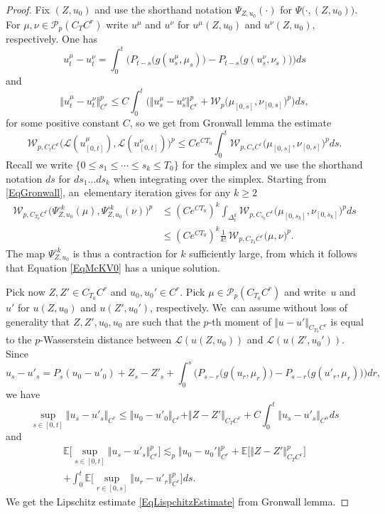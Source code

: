 \documentclass[10pt]{amsart}
\theoremstyle{definition}
\newcommand\bbE{\mathbb{E}}
\newcommand{\mcL}{\mathcal{L}}
\newcommand{\norme}[1]{\Vert #1 \Vert}
\begin{document}
\begin{proof}
Fix $(Z,u_0)$ and use the shorthand notation $\Psi_{Z,u_0}(\cdot)$ for $\Psi\bigl(\cdot,(Z,u_0)\bigr)$. For $\mu,\nu\in \mathcal{P}_p(C_TC^r)$ write $u^\mu$ and $u^{\nu}$ for $u^\mu(Z, u_0)$ and $u^{\nu}(Z, u_0)$, respectively. One has
\[
u^\mu_t - u_t^{\nu} = \int_0^t \bigl(P_{t-s}\bigl(g(u^\mu_s,\mu_s)\bigr) - P_{t-s}\bigl(g(u^{\nu}_s,\nu_s)\bigr)\bigr)ds
\]
and
\[
\big\Vert u^\mu_t-u^{\nu}_t \big\Vert_{C^r}^p \leq C\int_0^t \bigl(\big\Vert u^\mu_s - u^{\nu}_s\big\Vert_{C^r}^p + \mathcal{W}_p\bigl(\mu_{[0,s]},\nu_{[0,s]}\bigr)^p\bigr) ds,
\]
for some positive constant $C$, so we get from Gronwall lemma the estimate
\begin{equation} \label{EqGronwall}
\mathcal{W}_{p,C_tC^r}\bigl(\mcL(u^\mu_{[0,t]}),\mcL(u^{\nu}_{[0,t]})\bigr)^p \leq Ce^{CT_0}\int_0^t \mathcal{W}_{p,C_sC^r}\bigl(\mu_{[0,s]},\nu_{[0,s]}\bigr)^pds.
\end{equation}
Recall we write $\{0\leq s_1\leq \cdots\leq s_k\leq T_0\}$ for the simplex and we use the shorthand notation $ds$ for $ds_1\dots ds_k$ when integrating over the simplex. Starting from \eqref{EqGronwall}, an~elementary iteration gives for any $k\geq 2$
\begin{align*}
\mathcal{W}_{p,C_{T_0}C^r}\bigl(\Psi_{Z,u_0}^{\circ k}(\mu), \Psi_{Z,u_0}^{\circ k}(\nu)\bigr)^p &\leq (Ce^{CT_0})^k\int_{\Delta^k_t}
\mathcal{W}_{p,C_{s_k}C^r}\bigl(\mu_{[0,s_k]}, \nu_{[0,s_k]}\bigr)^pds \\
&\leq (Ce^{CT_0})^k \frac{1}{k!} \, \mathcal{W}_{p,C_{T_0}C^r}\bigl(\mu, \nu\bigr)^p.
\end{align*}
The map $\Psi_{Z,u_0}^{\circ k}$ is thus a contraction for $k$ sufficiently large, from which it follows that Equation \eqref{EqMcKV0} has a unique solution.

Pick now $Z, Z' \in C_{T_0}C^r$ and $u_0, u_0' \in C^r$. Pick $\mu\in \mathcal{P}_p(C_{T_0}C^r)$ and write~$u$ and~$u'$ for $u(Z, u_0)$ and $u(Z', u_0')$, respectively. We~can assume without loss of generality that $Z, Z', u_0, u_0 $ are such that the $p$-th moment of $\norme{u - u'}_{C_{T_0}C^r}$ is equal to the $p$-Wasserstein distance between $\mcL(u(Z,u_0))$ and $\mcL(u(Z', u_0' ))$. Since
\[
u_s - u'_s = P_s(u_0 - u'_0 ) + Z_s - Z' _s + \int_0^s \bigl( P_{s-r}\bigl(g(u_r,\mu_r)\bigr) - P_{s-r}\bigl(g(u'_r,\mu_r)\bigr)\bigr) dr,
\]
we have
\begin{equation*}
\sup_{s\in[0,t]} \norme{u_s - u'_s}_{C^r} \leq \norme{u_0 - u'_0 }_{C^r} + \norme{Z - Z' }_{C_T C^r} + C \int_0^t \norme{u_s - u'_s}_{C^\alpha} ds
\end{equation*}
and
\begin{multline*}
\bbE\bigl[\sup_{s\in[0,t]} \norme{u_s - u'_s}_{C^r}^p\bigr] \lesssim_p \norme{u_0 - u_0' }_{C^r}^p + \bbE\bigl[\norme{Z - Z' }_{C_T C^r}^p\bigr] \\[-5pt]
+ \int_0^t \bbE\bigl[\sup_{r\in[0,s]}\norme{u_r - u'_r}_{C^r}^p\bigr]ds.
\end{multline*}
We get the Lipschitz estimate \eqref{EqLispchitzEstimate} from Gronwall lemma.
\end{proof}
\end{document}
